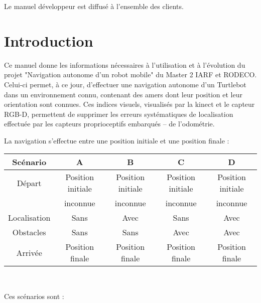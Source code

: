 \documentclass[10pt,a4paper]{article}
\begin{document}
Le manuel développeur est diffusé à l'ensemble des clients.


\newpage
\tableofcontents
\newpage

\section{Introduction}
\label{sec:introduction}

Ce manuel donne les informations nécessaires à l'utilisation et à l'évolution du projet "Navigation autonome d'un robot mobile" du Master 2 IARF et RODECO. Celui-ci permet, à ce jour, d'effectuer une navigation autonome d'un Turtlebot dans un environnement connu, contenant des amers dont leur position et leur orientation sont connues. Ces indices visuels, visualisés par la kinect et le capteur RGB-D, permettent de supprimer les erreurs systématiques de localisation effectuée par les capteurs proprioceptifs embarqués -- de l'odométrie.

La navigation s'effectue entre une position initiale et une position finale : 

\begin{center}
\begin{tabular}{c|c|c|c|c}
Scénario & A & B & C & D \\ \hline
Départ & Position initiale & Position initiale & Position initiale & Position initiale \\ 
 & inconnue & inconnue & inconnue & inconnue \\ \hline
Localisation & Sans & Avec & Sans & Avec \\ \hline
Obstacles & Sans & Sans & Avec & Avec \\ \hline
Arrivée & Position finale & Position finale  & Position finale & Position finale
\end{tabular}\\
\end{center}

\noindent Ces scénarios sont : \\
\end{document}
